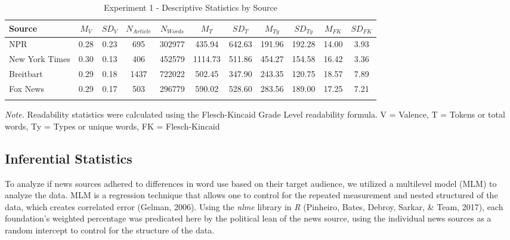 \documentclass[
  english,
  man,floatsintext]{apa6}
\begin{document}
\begin{table}[h]

\begin{center}
\begin{threeparttable}

\caption{\label{tab:exp1-source-descriptives}Experiment 1 - Descriptive Statistics by Source}

\footnotesize{

\begin{tabular}{lcccccccccc}
\toprule
Source & $M_V$ & $SD_V$ & $N_{Article}$ & $N_{Words}$ & $M_T$ & $SD_T$ & $M_{Ty}$ & $SD_{Ty}$ & $M_{FK}$ & $SD_{FK}$\\
\midrule
NPR & 0.28 & 0.23 & 695 & 302977 & 435.94 & 642.63 & 191.96 & 192.28 & 14.00 & 3.93\\
New York Times & 0.30 & 0.13 & 406 & 452579 & 1114.73 & 511.86 & 454.27 & 154.58 & 16.42 & 3.36\\
Breitbart & 0.29 & 0.18 & 1437 & 722022 & 502.45 & 347.90 & 243.35 & 120.75 & 18.57 & 7.89\\
Fox News & 0.29 & 0.17 & 503 & 296779 & 590.02 & 528.60 & 283.56 & 189.00 & 17.25 & 7.21\\
\bottomrule
\addlinespace
\end{tabular}

}

\begin{tablenotes}[para]
\normalsize{\textit{Note.} Readability statistics were calculated using the Flesch-Kincaid Grade Level readability formula. V = Valence, T = Tokens or total words, Ty = Types or unique words, FK = Flesch-Kincaid}
\end{tablenotes}

\end{threeparttable}
\end{center}

\end{table}

\hypertarget{inferential-statistics}{%
\subsection{Inferential Statistics}\label{inferential-statistics}}

To analyze if news sources adhered to differences in word use based on their target audience, we utilized a multilevel model (MLM) to analyze the data. MLM is a regression technique that allows one to control for the repeated measurement and nested structured of the data, which creates correlated error (Gelman, 2006). Using the \emph{nlme} library in \emph{R} (Pinheiro, Bates, Debroy, Sarkar, \& Team, 2017), each foundation's weighted percentage was predicated here by the political lean of the news source, using the individual news sources as a random intercept to control for the structure of the data.
\end{document}
